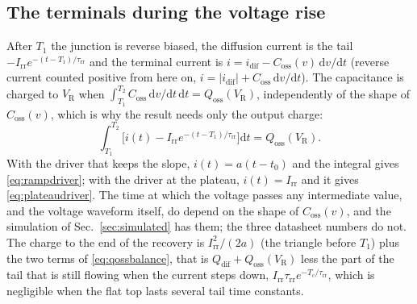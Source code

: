 \documentclass[10pt,a4paper]{scrartcl}
\newcommand{\VR}{V_\mathrm{R}}
\newcommand{\Irr}{I_\mathrm{rr}}
\newcommand{\Qdif}{Q_\mathrm{dif}}
\newcommand{\Qoss}{Q_\mathrm{oss}}
\newcommand{\Coss}{C_\mathrm{oss}}
\newcommand{\Tc}{T_\mathrm{c}}
\newcommand{\taurr}{\tau_\mathrm{rr}}
\newcommand{\Tone}{T_1}
\newcommand{\Ttwo}{T_2}
\newcommand{\idif}{i_\mathrm{dif}}
\newcommand{\diff}{\mathrm{d}}
\begin{document}
\subsection{The terminals during the voltage rise}
\label{app:terminals}
After $\Tone$ the junction is reverse biased, the diffusion current is the tail $-\Irr e^{-(t-\Tone)/\taurr}$ and the terminal current is $i = \idif - \Coss(v)\,\diff v/\diff t$ (reverse current counted positive from here on, $i = |\idif| + \Coss\,\diff v/\diff t$). The capacitance is charged to $\VR$ when $\int_{\Tone}^{\Ttwo}\Coss\,\diff v/\diff t\,\diff t = \Qoss(\VR)$, independently of the shape of $\Coss(v)$, which is why the result needs only the output charge:
\begin{equation}
\int_{\Tone}^{\Ttwo} \bigl[i(t) - \Irr e^{-(t-\Tone)/\taurr}\bigr]\diff t = \Qoss(\VR) .
\label{eq:qossbalance}
\end{equation}
With the driver that keeps the slope, $i(t) = a(t - t_0)$ and the integral gives \eqref{eq:rampdriver}; with the driver at the plateau, $i(t) = \Irr$ and it gives \eqref{eq:plateaudriver}. The time at which the voltage passes any intermediate value, and the voltage waveform itself, do depend on the shape of $\Coss(v)$, and the simulation of Sec.~\ref{sec:simulated} has them; the three datasheet numbers do not. The charge to the end of the recovery is $\Irr^2/(2a)$ (the triangle before $\Tone$) plus the two terms of \eqref{eq:qossbalance}, that is $\Qdif + \Qoss(\VR)$ less the part of the tail that is still flowing when the current steps down, $\Irr\taurr e^{-\Tc/\taurr}$, which is negligible when the flat top lasts several tail time constants.
\end{document}
